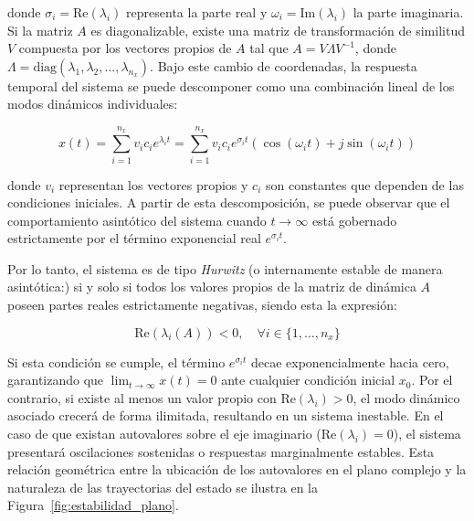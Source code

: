 donde $\sigma_i = \text{Re}(\lambda_i)$ representa la parte real y $\omega_i = \text{Im}(\lambda_i)$ la parte imaginaria. Si la matriz $A$ es diagonalizable, existe una matriz de transformación de similitud $V$ compuesta por los vectores propios de $A$ tal que $A = V \Lambda V^{-1}$, donde $\Lambda = \text{diag}(\lambda_1, \lambda_2, \dots, \lambda_{n_x})$. Bajo este cambio de coordenadas, la respuesta temporal del sistema se puede descomponer como una combinación lineal de los modos dinámicos individuales:

\begin{equation}
    x(t) = \sum_{i=1}^{n_x} v_i c_i e^{\lambda_i t} = \sum_{i=1}^{n_x} v_i c_i e^{\sigma_i t} \left( \cos(\omega_i t) + j\sin(\omega_i t) \right)
    \label{eq:modos_dinamicos}
\end{equation}

donde $v_i$ representan los vectores propios y $c_i$ son constantes que dependen de las condiciones iniciales. A partir de esta descomposición, se puede observar que el comportamiento asintótico del sistema cuando $t \to \infty$ está gobernado estrictamente por el término exponencial real $e^{\sigma_i t}$. 

Por lo tanto, el sistema es de tipo \textit{Hurwitz} (o internamente estable de manera asintótica:) si y solo si todos los valores propios de la matriz de dinámica $A$ poseen partes reales estrictamente negativas, siendo esta la expresión:

\begin{equation}
    \text{Re}(\lambda_i(A)) < 0, \quad \forall i \in \{1, \dots, n_x\}
    \label{eq:condicion_hurwitz}
\end{equation}

Si esta condición se cumple, el término $e^{\sigma_i t}$ decae exponencialmente hacia cero, garantizando que $\lim_{t \to \infty} x(t) = 0$ ante cualquier condición inicial $x_0$. Por el contrario, si existe al menos un valor propio con $\text{Re}(\lambda_i) > 0$, el modo dinámico asociado crecerá de forma ilimitada, resultando en un sistema inestable. En el caso de que existan autovalores sobre el eje imaginario ($\text{Re}(\lambda_i) = 0$), el sistema presentará oscilaciones sostenidas o respuestas marginalmente estables. Esta relación geométrica entre la ubicación de los autovalores en el plano complejo y la naturaleza de las trayectorias del estado se ilustra en la Figura~\ref{fig:estabilidad_plano}.

